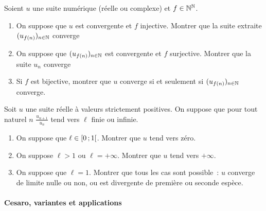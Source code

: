 \begin{exercice}
    Soient \(u\) une suite numérique (réelle ou complexe) et \(f \in \mathbb{N}^{\mathbb{N}}\).
    \begin{enumerate}
        \item On suppose que \(u\) est convergente et \(f\) injective. Montrer que la suite extraite \((u_{f(n)})_{n \in \mathbb{N}}\) converge
        \item On suppose que \((u_{f(n)})_{n \in \mathbb{N}}\) est convergente et \(f\) surjective. Montrer que la suite \(u_n\) converge
        \item Si \(f\) est bijective, montrer que \(u\) converge si et seulement si \((u_{f(n)})_{n \in \mathbb{N}}\) converge.
    \end{enumerate}
\end{exercice}
\begin{exercice}
    Soit \(u\) une suite réelle à valeurs strictement positives. On suppose que pour tout naturel \(n\) \(\frac{u_{n+1}}{u_n}\) tend vers \(\ell\) finie ou infinie.
    \begin{enumerate}
        \item On suppose que \(\ell \in \left[ 0 \, ;  1 \right[\). Montrer que \(u\) tend vers zéro.
        \item On suppose \(\ell > 1\) ou \(\ell = +\infty\). Montrer que \(u\) tend vers \(+\infty\).
        \item On suppose que \(\ell = 1\). Montrer que tous les cas sont possible~: \(u\) converge de limite nulle ou non, ou est divergente de première ou seconde espèce.
    \end{enumerate}
\end{exercice}
\paragraph{Cesaro, variantes et applications}
~~

